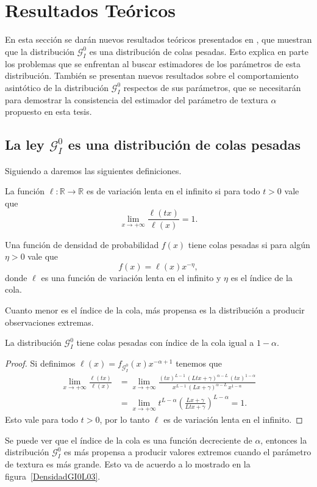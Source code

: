 \section{Resultados Teóricos}
\label{ResultadosTeoricosGI0}

En esta sección se darán nuevos resultados teóricos presentados en \citet{gambini2015}, que muestran que la distribución $\mathcal{G}_I^0$ es una distribución de colas pesadas. Esto explica en parte los problemas que se enfrentan al buscar estimadores de los parámetros de esta distribución.  También se presentan nuevos resultados sobre el comportamiento asintótico de la distribución $\mathcal{G}_I^0$ respectos de sus parámetros, que se necesitarán para demostrar la consistencia del estimador del parámetro de textura $\alpha$ propuesto en esta tesis.

\subsection{La ley $\mathcal{G}_I^0$ es una distribución de colas pesadas}
\label{colas}
Siguiendo a \citet{Gre,Jorgensen,Rojo} daremos las siguientes definiciones.

\begin{definition} \label{Def:lenta}
	La función $\ell\colon\mathbb R \to\mathbb R$ es de variación lenta en el infinito si para todo $t>0$ vale que
	$$
	\lim_{x\to+\infty}\dfrac{\ell (tx)}{\ell(x)}=1.
	$$
\end{definition}

\begin{definition} 
	Una función de densidad de probabilidad $f(x)$ tiene colas pesadas si para algún $\eta >0$ vale que
	$$
	f(x)=\ell(x)  x^{-\eta},
	$$
	donde $\ell$ es una función de variación lenta en el infinito y $\eta$ es el índice de la cola.
\end{definition}
Cuanto menor es el índice de la cola, más propensa es la distribución a producir observaciones extremas.

\begin{proposition}
	La distribución $\mathcal G_{I}^0$ tiene colas pesadas con índice de la cola igual a $1-\alpha$.
\end{proposition}
\begin{proof}
	Si definimos $\ell(x)=f_{\mathcal G_I^0}(x) x^{-\alpha+1}$ tenemos que
	\begin{align*}
	\lim_{x\to+\infty}\frac{\ell(t x)}{\ell(x)}&=\lim_{x\to+\infty}\frac{(tx)^{L-1} \, (Ltx+\gamma)^{\alpha-L} \, (tx)^{1-\alpha}}{x^{L-1} \, (Lx+\gamma)^{\alpha-L} \, x^{1-\alpha}}\\
	&=\lim_{x\to+\infty}t^{L-\alpha}\left(\frac{Lx+\gamma}{L tx+\gamma}\right)^{L-\alpha}=1.
	\end{align*}
	Esto vale para todo $t>0$, por lo tanto $\ell$ es de variación lenta en el infinito.
\end{proof}
Se puede ver que el índice de la cola es una función decreciente de $\alpha$, entonces la distribución $\mathcal G_I^0$ es más propensa a producir valores extremos cuando el parámetro de textura es más grande. Esto va de acuerdo a lo mostrado en la figura~\ref{DensidadGI0L03}.

